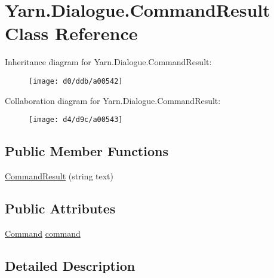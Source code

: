 \hypertarget{a00030}{\section{Yarn.\-Dialogue.\-Command\-Result Class Reference}
\label{a00030}
}


Inheritance diagram for Yarn.\-Dialogue.\-Command\-Result\-:
\nopagebreak
\begin{figure}[H]
\begin{center}
\leavevmode
\texttt{[image: d0/ddb/a00542]}
\end{center}
\end{figure}


Collaboration diagram for Yarn.\-Dialogue.\-Command\-Result\-:
\nopagebreak
\begin{figure}[H]
\begin{center}
\leavevmode
\texttt{[image: d4/d9c/a00543]}
\end{center}
\end{figure}
\subsection*{Public Member Functions}
\begin{DoxyCompactItemize}
\item 
\hyperlink{a00030_a1a553422394fb0c854d1184985f993bb}{Command\-Result} (string text)
\end{DoxyCompactItemize}
\subsection*{Public Attributes}
\begin{DoxyCompactItemize}
\item 
\hyperlink{a00029_d7/df2/a00312}{Command} \hyperlink{a00030_a420ca0984d6e5c33bb761654305c592e}{command}
\end{DoxyCompactItemize}


\subsection{Detailed Description}


